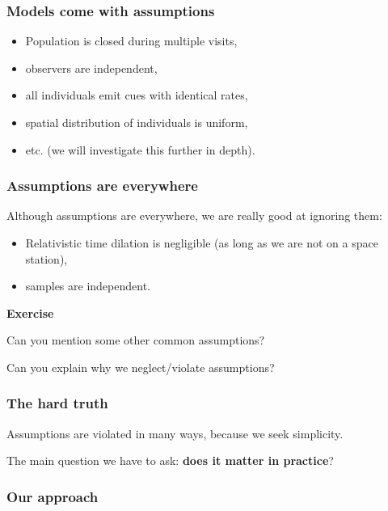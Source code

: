 \documentclass[12pt,]{book}
\providecommand{\tightlist}{%
  \setlength{\itemsep}{0pt}\setlength{\parskip}{0pt}}
\let\BeginKnitrBlock\begin \let\EndKnitrBlock\end
\begin{document}
\hypertarget{models-come-with-assumptions}{%
\subsubsection{Models come with assumptions}\label{models-come-with-assumptions}}

\begin{itemize}
\tightlist
\item
  Population is closed during multiple visits,
\item
  observers are independent,
\item
  all individuals emit cues with identical rates,
\item
  spatial distribution of individuals is uniform,
\item
  etc. (we will investigate this further in depth).
\end{itemize}

\hypertarget{assumptions-are-everywhere}{%
\subsubsection{Assumptions are everywhere}\label{assumptions-are-everywhere}}

Although assumptions are everywhere, we are really good at ignoring them:

\begin{itemize}
\tightlist
\item
  Relativistic time dilation is negligible (as long as we are not on a space station),
\item
  samples are independent.
\end{itemize}

\BeginKnitrBlock{rmdexercise}
\textbf{Exercise}

Can you mention some other common assumptions?

Can you explain why we neglect/violate assumptions?
\EndKnitrBlock{rmdexercise}

\hypertarget{the-hard-truth}{%
\subsubsection{The hard truth}\label{the-hard-truth}}

Assumptions are violated in many ways, because we seek simplicity.

The main question we have to ask: \textbf{does it matter in practice}?

\hypertarget{our-approach}{%
\subsubsection{Our approach}\label{our-approach}}
\end{document}
